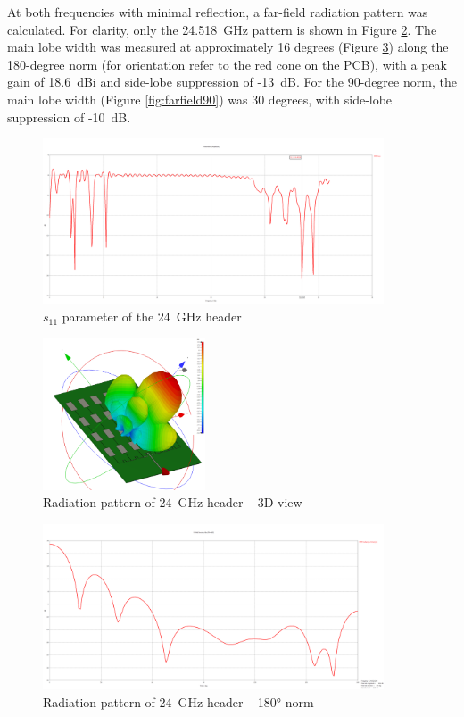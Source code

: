 At both frequencies with minimal reflection, a far-field radiation pattern was calculated.
For clarity, only the 24.518~GHz pattern is shown in Figure \ref{fig:farfield3d}.
The main lobe width was measured at approximately 16 degrees (Figure \ref{fig:farfield180}) along the 180-degree norm (for orientation refer to the red cone on the PCB), with a peak gain of 18.6~dBi and side-lobe suppression of -13~dB.
For the 90-degree norm, the main lobe width (Figure \ref{fig:farfield90}) was 30 degrees, with side-lobe suppression of -10~dB.

\begin{figure}[h!]
  \centering
  \includegraphics[width=0.9\textwidth]{../img/s11.png}
  \caption[$s_{11}$ parameter of the 24~GHz header]{$s_{11}$ parameter of the 24~GHz header}
  \label{fig:s11}
\end{figure}


\begin{figure}[h!]
  \centering
  \includegraphics[width=0.43\textwidth]{../img/farfield3d.png}
  \caption[Radiation pattern of 24~GHz header -- 3D view]{Radiation pattern of 24~GHz header -- 3D view}
  \label{fig:farfield3d}
\end{figure}

\begin{figure}[h!]
  \centering
  \includegraphics[width=0.9\textwidth]{../img/farfield180.png}
  \caption[Radiation pattern of 24~GHz header -- 180° norm]{Radiation pattern of 24~GHz header -- 180° norm}
  \label{fig:farfield180}
\end{figure}

